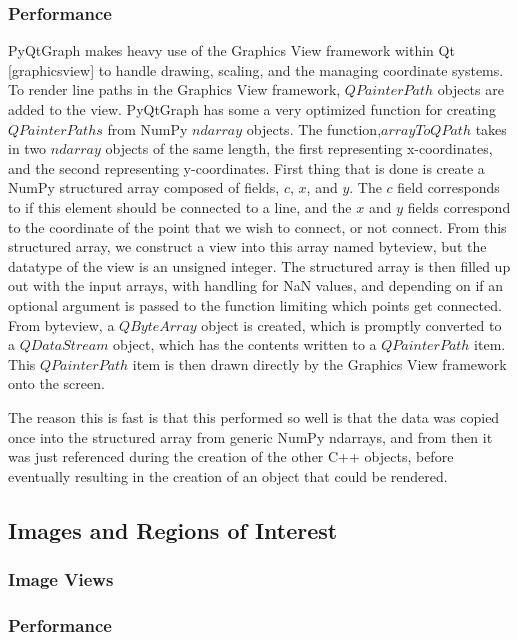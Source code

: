 \documentclass[journal]{vgtc}                %
\begin{document}
\subsubsection{Performance}

PyQtGraph makes heavy use of the Graphics View framework within Qt [graphicsview] to handle drawing, scaling, and the managing coordinate systems.  To render line paths in the Graphics View framework, $QPainterPath$ objects are added to the view.  PyQtGraph has some a very optimized function for creating $QPainterPaths$ from NumPy $ndarray$ objects.  The function,$arrayToQPath$ takes in two $ndarray$ objects of the same length, the first representing x-coordinates, and the second representing y-coordinates. First thing that is done is create a NumPy structured array composed of fields, $c$, $x$, and $y$.  The $c$ field corresponds to if this element should be connected to a line, and the $x$ and $y$ fields correspond to the coordinate of the point that we wish to connect, or not connect.  From this structured array, we construct a view into this array named byteview, but the datatype of the view is an unsigned integer.  The structured array is then filled up out with the input arrays, with handling for NaN values, and depending on if an optional argument is passed to the function limiting which points get connected.  From byteview, a $QByteArray$ object is created, which is promptly converted to a $QDataStream$ object, which has the contents written to a $QPainterPath$ item.  This $QPainterPath$ item is then drawn directly by the Graphics View framework onto the screen.

The reason this is fast is that this performed so well is that the data was copied once into the structured array from generic NumPy ndarrays, and from then it was just referenced during the creation of the other C++ objects, before eventually resulting in the creation of an object that could be rendered.

\subsection{Images and Regions of Interest}
\subsubsection{Image Views}

\subsubsection{Performance}
\end{document}
